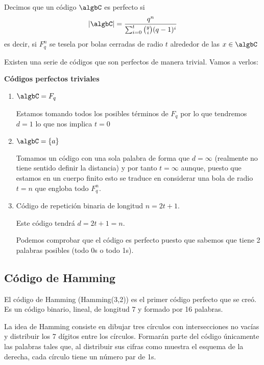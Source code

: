 \begin{defn}
Decimos que un código $\algbC$ es perfecto si
\[|\algbC| = \frac{q^n}{\sum_{i=0}^t {y \choose i} (q-1)^i}\]
es decir, si $F_q^n$ se tesela por bolas cerradas de radio $t$ alrededor de las $x \in \algbC$
\end{defn}

Existen una serie de códigos que son perfectos de manera trivial. Vamos a verlos:

\textbf{Códigos perfectos triviales}
\begin{enumerate}
\item $\algbC=F_q$

Estamos tomando todos los posibles términos de $F_q$ por lo que tendremos $d=1$ lo que nos implica $t=0$

\item $\algbC=\{a\}$

Tomamos un código con una sola palabra de forma que $d=\infty$ (realmente no tiene sentido definir la distancia) y por tanto $t=\infty$ aunque, puesto que estamos en un cuerpo finito esto se traduce en considerar una bola de radio $t=n$ que engloba todo $F_q^n$.

\item Código de repetición binaria de longitud $n=2t+1$.

Este código tendrá $d=2t+1 =n$.

Podemos comprobar que el código es perfecto puesto que sabemos que tiene 2 palabras posibles (todo 0s o todo 1s).

\end{enumerate}

\subsection{Código de Hamming}
\begin{defn}
El código de Hamming (Hamming(3,2)) es el primer código perfecto que se creó. Es un código binario, lineal, de longitud 7 y formado por 16 palabras.
\end{defn}

\begin{minipage}{0.57\textwidth}
La idea de Hamming consiste en dibujar tres círculos con intersecciones no vacías y distribuir los 7 dígitos entre los círculos. Formarán parte del código únicamente las palabras tales que, al distribuir sus cifras como muestra el esquema de la derecha, cada círculo tiene un número par de 1s.
\end{minipage}
\begin{minipage}{0.42\textwidth}
\begin{center}
\end{center}
\end{minipage}

